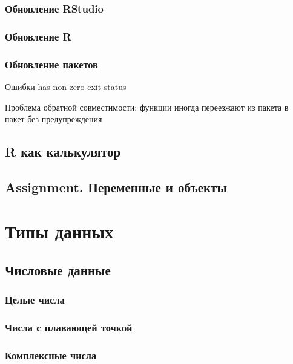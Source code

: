 \documentclass[
  letterpaper,
]{scrbook}
\theoremstyle{definition}
\theoremstyle{remark}
\begin{document}
\subsection{Обновление RStudio}\label{rbasics-updates-rstudio}

\subsection{Обновление R}\label{rbasics-updates-r}

\subsection{Обновление пакетов}\label{rbasics-updates-packages}

Ошибки has non-zero exit status

Проблема обратной совместимости: функции иногда переезжают из пакета в
пакет без предупреждения

\section{R как калькулятор}\label{rbasics-r-calculator}

\section{Assignment. Переменные и
объекты}\label{rbasics-vars-and-objects}


\chapter{Типы данных}\label{rdtypes}

\section{Числовые данные}\label{rdtypes-numbers}

\subsection{Целые числа}\label{rdtypes-integer}

\subsection{Числа с плавающей точкой}\label{rdtypes-numeric}

\subsection{Комплексные числа}\label{rdtypes-complex}
\end{document}
